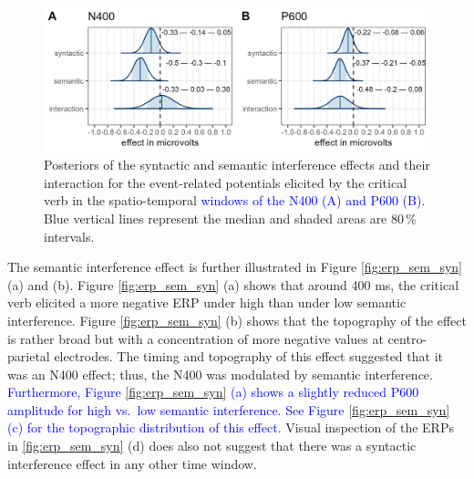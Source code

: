 \documentclass[a4paper, man, floatsintext]{apa7}
\begin{document}
\begin{figure}[H]
    \caption{Posteriors of the syntactic and semantic interference effects and their interaction for the event-related potentials elicited by the critical verb in the spatio-temporal \textcolor{blue}{windows of the N400 (A) and P600 (B)}. Blue vertical lines represent the median and shaded areas are 80\,\% intervals.}
    \label{fig:eeg_posteriors}
    \centering
    \includegraphics[width=\textwidth]{images/posteriors_eeg.jpg}
\end{figure}


The semantic interference effect is further illustrated in Figure \ref{fig:erp_sem_syn} (a) and (b). Figure \ref{fig:erp_sem_syn} (a) shows that around 400 ms, the critical verb elicited a more negative ERP under high than under low semantic interference. Figure \ref{fig:erp_sem_syn} (b) shows that the topography of the effect is rather broad but with a concentration of more negative values at centro-parietal electrodes. The timing and topography of this effect suggested that it was an N400 effect; thus, the N400 was modulated by semantic interference. \textcolor{blue}{Furthermore, Figure \ref{fig:erp_sem_syn} (a) shows a slightly reduced P600 amplitude for high vs.\ low semantic interference. See Figure \ref{fig:erp_sem_syn} (c) for the topographic distribution of this effect.} \label{ERP_results2} Visual inspection of the ERPs in \ref{fig:erp_sem_syn} (d) does also not suggest that there was a syntactic interference effect in any other time window.
\end{document}
